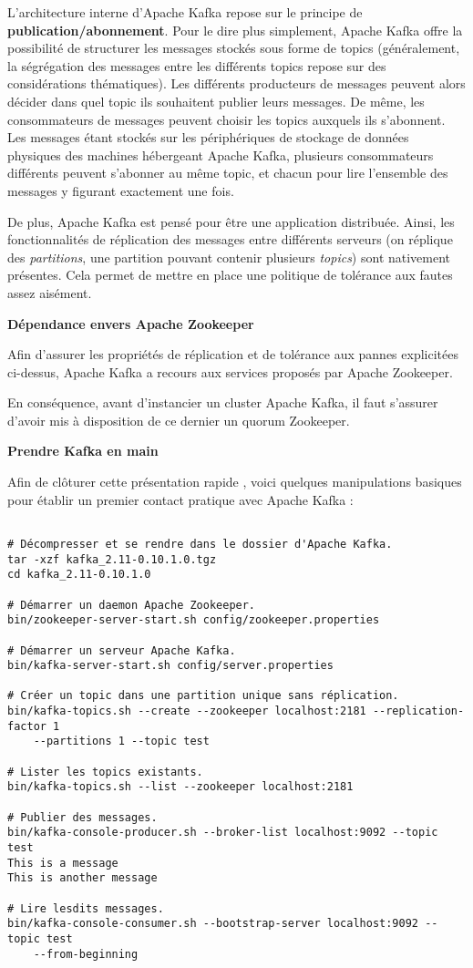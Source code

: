 \documentclass[a4paper,oneside,11pt]{article}
\begin{document}
L'architecture interne d'Apache Kafka repose sur le principe de 
\textbf{publication/abonnement}. Pour le dire plus simplement, Apache Kafka
offre la possibilité de structurer les messages stockés sous forme
de topics (généralement, la ségrégation des messages entre les
différents topics repose sur des considérations thématiques).
Les différents producteurs de messages peuvent alors décider dans
quel topic ils souhaitent publier leurs messages. 
De même, les consommateurs de messages peuvent choisir les topics
auxquels ils s'abonnent. Les messages étant stockés sur les 
périphériques de stockage de données physiques des machines hébergeant
Apache Kafka, plusieurs consommateurs différents peuvent s'abonner au
même topic, et chacun pour lire l'ensemble des messages y figurant
exactement une fois.

De plus, Apache Kafka est pensé pour être une application distribuée.
Ainsi, les fonctionnalités de réplication des messages entre 
différents serveurs (on réplique des \textit{partitions}, une partition 
pouvant contenir plusieurs \textit{topics}) sont nativement présentes.
Cela permet de mettre en place une politique de tolérance aux fautes
assez aisément.

\textbf{Dépendance envers Apache Zookeeper}

Afin d'assurer les propriétés de réplication et de tolérance aux 
pannes explicitées ci-dessus, Apache Kafka a recours aux services
proposés par Apache Zookeeper.

En conséquence, avant d'instancier un cluster Apache Kafka, il faut
s'assurer d'avoir mis à disposition de ce dernier un quorum Zookeeper.

\textbf{Prendre Kafka en main}

Afin de clôturer cette présentation rapide , voici quelques 
manipulations basiques pour établir un premier contact pratique 
avec Apache Kafka :
\begin{verbatim}

# Décompresser et se rendre dans le dossier d'Apache Kafka.
tar -xzf kafka_2.11-0.10.1.0.tgz
cd kafka_2.11-0.10.1.0

# Démarrer un daemon Apache Zookeeper.
bin/zookeeper-server-start.sh config/zookeeper.properties

# Démarrer un serveur Apache Kafka.
bin/kafka-server-start.sh config/server.properties

# Créer un topic dans une partition unique sans réplication.
bin/kafka-topics.sh --create --zookeeper localhost:2181 --replication-factor 1 
	--partitions 1 --topic test
	
# Lister les topics existants.
bin/kafka-topics.sh --list --zookeeper localhost:2181

# Publier des messages.
bin/kafka-console-producer.sh --broker-list localhost:9092 --topic test
This is a message
This is another message

# Lire lesdits messages.
bin/kafka-console-consumer.sh --bootstrap-server localhost:9092 --topic test 
	--from-beginning
\end{verbatim}
\end{document}

